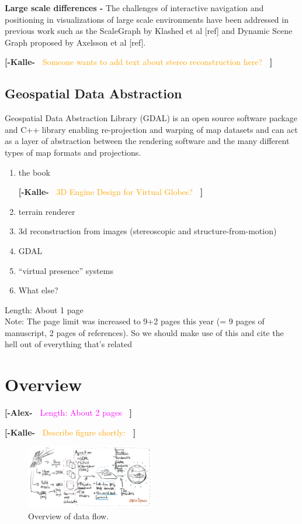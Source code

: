 \documentclass[journal]{vgtc}                %
\newcommand{\kallecomment}[1]{\textbf{[-Kalle-~}
    \textcolor{orange}{#1}
    \textbf{~]}}
\newcommand{\alexcomment}[1]{\textbf{[-Alex-~}
    \textcolor{magenta}{#1}
    \textbf{~]}}
\begin{document}
\textbf{Large scale differences - } The challenges of interactive navigation and positioning in visualizations of large scale environments have been addressed in previous work such as the ScaleGraph by Klashed et al [ref] and Dynamic Scene Graph proposed by Axelsson et al [ref].

\kallecomment{Someone wants to add text about stereo reconstruction here?}

\subsection{Geospatial Data Abstraction}

Geospatial Data Abstraction Library (GDAL) is an open source software package and C++ library enabling re-projection and warping of map datasets and can act as a layer of abstraction between the rendering software and the many different types of map formats and projections.

\begin{enumerate}
\item the book

\kallecomment{3D Engine Design for Virtual Globes?}

\item terrain renderer
\item 3d reconstruction from images (stereoscopic and structure-from-motion)
\item GDAL
\item ``virtual presence'' systems
\item What else?
\end{enumerate}
Length: About 1 page\\
Note:  The page limit was increased to 9+2 pages this year (= 9 pages of manuscript, 2 pages of references). So we should make use of this and cite the hell out of everything that's related

\section{Overview} \label{sec:overview}

\alexcomment{Length: About 2 pages}

\kallecomment{Describe figure shortly:}

\begin{figure}[h]
  \centering
    \includegraphics[width=0.5\textwidth]{figures/globe_browsing_data.png}
  \caption{Overview of data flow.}
\end{figure}
\end{document}

